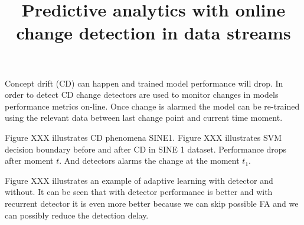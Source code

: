 \documentclass[12 pt]{article}
\title{Predictive analytics with online change detection in data streams}
\date{}
\begin{document}
	\maketitle
  Concept drift (CD) can happen and trained model performance will drop.  In
  order to detect CD change detectors are used to monitor changes in models
  performance metrics on-line. Once change is alarmed the model can be
  re-trained using the relevant data between last change point and current time
  moment.

  Figure XXX illustrates CD phenomena SINE1. 
  Figure XXX illustrates SVM decision boundary before and after CD in SINE 1 dataset.
  Performance drops after moment $t$. 
  And detectors alarms the change at the moment $t_1$.

  Figure XXX illustrates an example of adaptive learning with detector and
  without. It can be seen that with detector performance is better and with
  recurrent detector it is even more better because we can skip possible FA and
  we can possibly reduce the detection delay.
\end{document}
